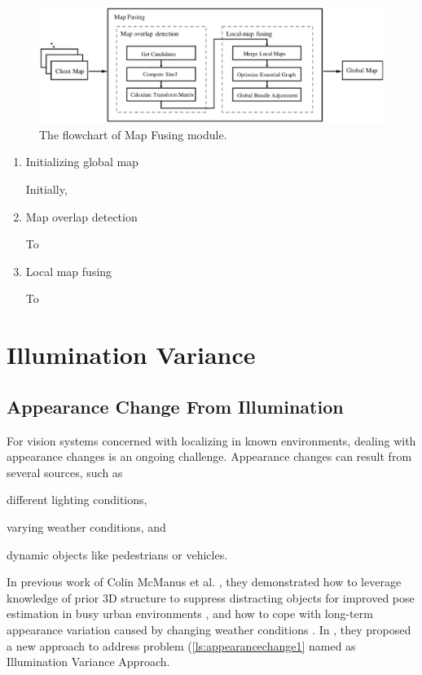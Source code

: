 \begin{figure}[H]
	\centering
	\includegraphics[width=5in]{Chapter2/corbslamserver.eps}
	\caption{The flowchart of Map Fusing module.}
	\label{fig:corbslamserver} 
\end{figure}

\begin{enumerate}[1.]
	\item Initializing global map
	
	Initially,
	
	\item Map overlap detection
	
	To
	
	\item Local map fusing 
	
	To 
\end{enumerate}

\section{Illumination Variance}

\subsection{Appearance Change From Illumination}
For vision systems concerned with localizing in known environments, dealing with appearance changes is an ongoing challenge. Appearance changes can result from several sources, such as 
\begin{inparaenum}[(i)]
	\item different lighting conditions,	
		\label{ls:appearancechange1}
	\item varying weather conditions, and
		\label{ls:appearancechange2}
	\item dynamic objects like pedestrians or vehicles.
		\label{ls:appearancechange3}
\end{inparaenum}

In previous work of Colin McManus et al. , they demonstrated how to leverage knowledge of prior 3D structure to suppress distracting objects for improved pose estimation in busy urban environments \cite{mcmanus2013distraction}, and how to cope with long-term appearance variation caused by changing weather conditions \cite{churchill2012practice}. In \cite{maddern2014illumination}, they proposed a new approach to address problem (\ref{ls:appearancechange1} named as Illumination Variance Approach. 

